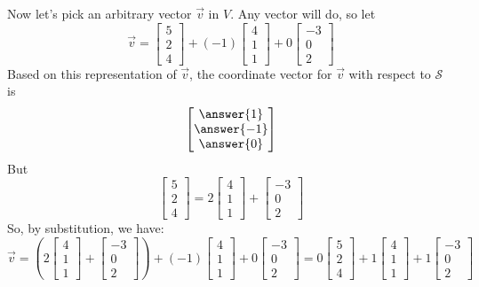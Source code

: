 \documentclass{ximera}
\begin{document}
\begin{example}
\begin{explanation}
Now let's pick an arbitrary vector $\vec{v}$ in $V$.  Any vector will do, so let 
$$\vec{v}=\begin{bmatrix}5\\2\\4\end{bmatrix}+ (-1)\begin{bmatrix}4\\1\\1\end{bmatrix}+0\begin{bmatrix}-3\\0\\2\end{bmatrix}$$
Based on this representation of $\vec{v}$, the coordinate vector for $\vec{v}$ with respect to $\mathcal{S}$ is 
$$\begin{bmatrix}\answer{1}\\\answer{-1}\\\answer{0}\end{bmatrix}$$
But 
$$\begin{bmatrix}5\\2\\4\end{bmatrix}=2\begin{bmatrix}4\\1\\1\end{bmatrix}+\begin{bmatrix}-3\\0\\2\end{bmatrix}$$
So, by substitution, we have:
$$\vec{v}=\left(2\begin{bmatrix}4\\1\\1\end{bmatrix}+\begin{bmatrix}-3\\0\\2\end{bmatrix}\right)+ (-1)\begin{bmatrix}4\\1\\1\end{bmatrix}+0\begin{bmatrix}-3\\0\\2\end{bmatrix}=0\begin{bmatrix}5\\2\\4\end{bmatrix}+ 1\begin{bmatrix}4\\1\\1\end{bmatrix}+1\begin{bmatrix}-3\\0\\2\end{bmatrix}$$

\end{explanation}
\end{example}
\end{document}
